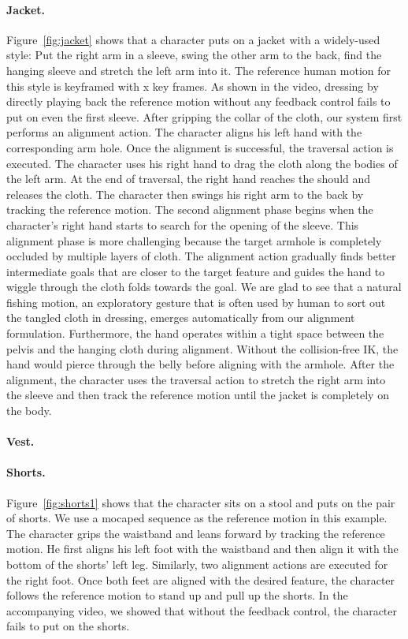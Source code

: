 \paragraph{Jacket.} Figure~\ref{fig:jacket} shows that a character puts on a jacket with a widely-used style: Put the right arm in a sleeve, swing the other arm to the back, find the hanging sleeve and stretch the left arm into it. The reference human motion for this style is keyframed with x key frames. As shown in the video, dressing by directly playing back the reference motion without any feedback control fails to put on even the first sleeve. After gripping the collar of the cloth, our system first performs an alignment action. The character aligns his left hand with the corresponding arm hole. Once the alignment is successful, the traversal action is executed. The character uses his right hand to drag the cloth along the bodies of the left arm. At the end of traversal, the right hand reaches the should and releases the cloth. The character then swings his right arm to the back by tracking the reference motion. The second alignment phase begins when the character's right hand starts to search for the opening of the sleeve. This alignment phase is more challenging because the target armhole is completely occluded by multiple layers of cloth. The alignment action gradually finds better intermediate goals that are closer to the target feature and guides the hand to wiggle through the cloth folds towards the goal. We are glad to see that a natural fishing motion, an exploratory gesture that is often used by human to sort out the tangled cloth in dressing, emerges automatically from our alignment formulation. Furthermore, the hand operates within a tight space between the pelvis and the hanging cloth during alignment. Without the collision-free IK, the hand would pierce through the belly before aligning with the armhole. After the alignment, the character uses the traversal action to stretch the right arm into the sleeve and then track the reference motion until the jacket is completely on the body.

\paragraph{Vest.}



\paragraph{Shorts.} Figure~\ref{fig:shorts1} shows that the character sits on a stool and puts on the pair of shorts. We use a mocaped sequence as the reference motion in this example. The character grips the waistband and leans forward by tracking the reference motion. He first aligns his left foot with the waistband and then align it with the bottom of the shorts' left leg. Similarly, two alignment actions are executed for the right foot. Once both feet are aligned with the desired feature, the character follows the reference motion to stand up and pull up the shorts. In the accompanying video, we showed that without the feedback control, the character fails to put on the shorts.

